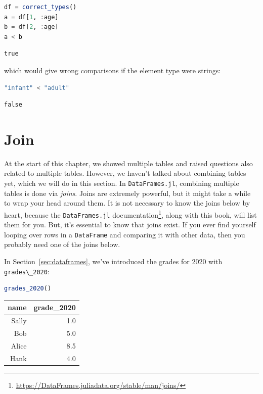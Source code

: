 \documentclass[
  notoc %
]{tufte-book}
\DeclareRobustCommand{\href}[2]{#2\footnote{\url{#1}}}
\newcommand{\passthrough}[1]{#1}
\begin{document}
\begin{lstlisting}[language=Julia]
df = correct_types()
a = df[1, :age]
b = df[2, :age]
a < b
\end{lstlisting}

\begin{lstlisting}[language=Output]
true
\end{lstlisting}

which would give wrong comparisons if the element type were strings:

\begin{lstlisting}[language=Julia]
"infant" < "adult"
\end{lstlisting}

\begin{lstlisting}[language=Output]
false
\end{lstlisting}

\hypertarget{sec:join}{%
\section{Join}\label{sec:join}}

At the start of this chapter, we showed multiple tables and raised
questions also related to multiple tables. However, we haven't talked
about combining tables yet, which we will do in this section. In
\passthrough{\lstinline!DataFrames.jl!}, combining multiple tables is
done via \emph{joins}. Joins are extremely powerful, but it might take a
while to wrap your head around them. It is not necessary to know the
joins below by heart, because the
\href{https://DataFrames.juliadata.org/stable/man/joins/}{\passthrough{\lstinline!DataFrames.jl!}
documentation}, along with this book, will list them for you. But, it's
essential to know that joins exist. If you ever find yourself looping
over rows in a \passthrough{\lstinline!DataFrame!} and comparing it with
other data, then you probably need one of the joins below.

In Section~\ref{sec:dataframes}, we've introduced the grades for 2020
with \passthrough{\lstinline!grades\_2020!}:

\begin{lstlisting}[language=Julia]
grades_2020()
\end{lstlisting}

\begin{longtable}[]{@{}rr@{}}
\toprule
name & grade\_2020 \\
\midrule
\endhead
Sally & 1.0 \\
Bob & 5.0 \\
Alice & 8.5 \\
Hank & 4.0 \\
\bottomrule
\end{longtable}
\end{document}
